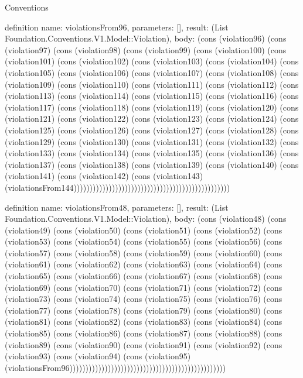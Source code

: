 \begin{lexlean}{Conventions}
\begin{semanticmodule}
definition{
  name: violationsFrom96,
  parameters: [],
  result: (List Foundation.Conventions.V1.Model::Violation),
  body: (cons (violation96) (cons (violation97) (cons (violation98) (cons (violation99) (cons (violation100) (cons (violation101) (cons (violation102) (cons (violation103) (cons (violation104) (cons (violation105) (cons (violation106) (cons (violation107) (cons (violation108) (cons (violation109) (cons (violation110) (cons (violation111) (cons (violation112) (cons (violation113) (cons (violation114) (cons (violation115) (cons (violation116) (cons (violation117) (cons (violation118) (cons (violation119) (cons (violation120) (cons (violation121) (cons (violation122) (cons (violation123) (cons (violation124) (cons (violation125) (cons (violation126) (cons (violation127) (cons (violation128) (cons (violation129) (cons (violation130) (cons (violation131) (cons (violation132) (cons (violation133) (cons (violation134) (cons (violation135) (cons (violation136) (cons (violation137) (cons (violation138) (cons (violation139) (cons (violation140) (cons (violation141) (cons (violation142) (cons (violation143) (violationsFrom144)))))))))))))))))))))))))))))))))))))))))))))))))
}

definition{
  name: violationsFrom48,
  parameters: [],
  result: (List Foundation.Conventions.V1.Model::Violation),
  body: (cons (violation48) (cons (violation49) (cons (violation50) (cons (violation51) (cons (violation52) (cons (violation53) (cons (violation54) (cons (violation55) (cons (violation56) (cons (violation57) (cons (violation58) (cons (violation59) (cons (violation60) (cons (violation61) (cons (violation62) (cons (violation63) (cons (violation64) (cons (violation65) (cons (violation66) (cons (violation67) (cons (violation68) (cons (violation69) (cons (violation70) (cons (violation71) (cons (violation72) (cons (violation73) (cons (violation74) (cons (violation75) (cons (violation76) (cons (violation77) (cons (violation78) (cons (violation79) (cons (violation80) (cons (violation81) (cons (violation82) (cons (violation83) (cons (violation84) (cons (violation85) (cons (violation86) (cons (violation87) (cons (violation88) (cons (violation89) (cons (violation90) (cons (violation91) (cons (violation92) (cons (violation93) (cons (violation94) (cons (violation95) (violationsFrom96)))))))))))))))))))))))))))))))))))))))))))))))))
}


\end{semanticmodule}
\end{lexlean}
